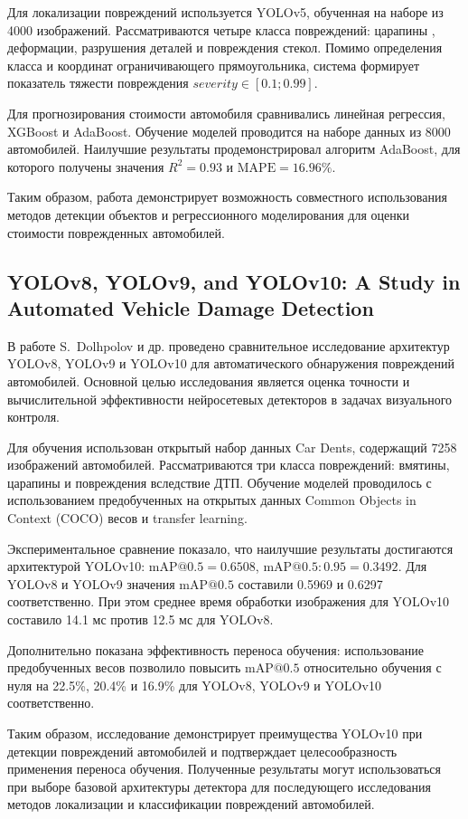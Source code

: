 \documentclass[12pt,a4paper]{article}
\begin{document}
Для локализации повреждений используется  YOLOv5,
обученная на наборе из 4000 изображений.
Рассматриваются четыре класса повреждений: царапины
, деформации, разрушения деталей
 и повреждения стекол.
Помимо определения класса и координат ограничивающего
прямоугольника, система формирует показатель тяжести
повреждения $severity \in [0.1; 0.99] $.

Для прогнозирования стоимости автомобиля сравнивались
линейная регрессия, XGBoost и AdaBoost. Обучение моделей
проводится на наборе данных из 8000 автомобилей.
Наилучшие результаты продемонстрировал алгоритм AdaBoost,
для которого получены значения
$R^2 = 0.93$ и $\mathrm{MAPE} = 16.96\%$.

Таким образом, работа демонстрирует возможность совместного
использования методов детекции объектов и регрессионного
моделирования для оценки стоимости поврежденных автомобилей.

\subsection{YOLOv8, YOLOv9, and YOLOv10: A Study in
Automated Vehicle Damage Detection }
В работе S.~Dolhpolov и др.
проведено сравнительное исследование архитектур YOLOv8,
YOLOv9 и YOLOv10 для автоматического обнаружения
повреждений автомобилей. Основной целью исследования
является оценка точности и вычислительной эффективности
нейросетевых детекторов в задачах визуального контроля.

Для обучения использован открытый набор данных
Car Dents, содержащий 7258 изображений автомобилей.
Рассматриваются три класса повреждений: вмятины,
царапины и повреждения вследствие ДТП.
Обучение моделей проводилось с использованием
предобученных на открытых данных Common Objects in Context (COCO) весов и transfer learning. 

Экспериментальное сравнение показало, что наилучшие
результаты достигаются архитектурой YOLOv10:
$\mathrm{mAP@0.5} = 0.6508$,
$\mathrm{mAP@0.5:0.95} = 0.3492$.
Для YOLOv8 и YOLOv9 значения $\mathrm{mAP@0.5}$
составили 0.5969 и 0.6297 соответственно.
При этом среднее время обработки изображения
для YOLOv10 составило 14.1 мс против 12.5 мс
для YOLOv8. 

Дополнительно показана эффективность переноса обучения:
использование предобученных весов позволило повысить
$\mathrm{mAP@0.5}$ относительно обучения с нуля
на 22.5\%, 20.4\% и 16.9\% для YOLOv8,
YOLOv9 и YOLOv10 соответственно.

Таким образом, исследование демонстрирует преимущества
YOLOv10 при детекции повреждений автомобилей
и подтверждает целесообразность применения переноса
обучения. Полученные результаты могут использоваться
при выборе базовой архитектуры детектора для последующего
исследования методов локализации и классификации
повреждений автомобилей.
\end{document}
